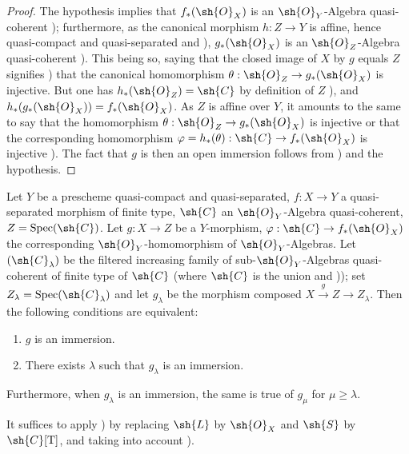 \begin{proof}
The hypothesis implies that $f_*(\sh{O}_X)$ is an $\sh{O}_Y$-Algebra quasi-coherent ); furthermore, as the canonical morphism $h:Z\to Y$ is affine, hence quasi-compact and quasi-separated  and ), $g_*(\sh{O}_X)$ is an $\sh{O}_Z$-Algebra quasi-coherent ).
This being so, saying that the closed image of $X$ by $g$ equals $Z$ signifies ) that the canonical homomorphism $\theta:\sh{O}_Z\to g_*(\sh{O}_X)$ is injective.
But one has $h_*(\sh{O}_Z)=\sh{C}$ by definition of $Z$ ), and $h_*(g_*(\sh{O}_X))=f_*(\sh{O}_X)$.
As $Z$ is affine over $Y$, it amounts to the same to say that the homomorphism $\theta:\sh{O}_Z\to g_*(\sh{O}_X)$ is injective or that the corresponding homomorphism $\varphi=h_*(\theta):\sh{C}\to f_*(\sh{O}_X)$ is injective ).
The fact that $g$ is then an open immersion follows from ) and the hypothesis.
\end{proof}

\begin{lemma}[8.12.2]
\label{IV.8.12.2}
Let $Y$ be a prescheme quasi-compact and quasi-separated, $f:X\to Y$ a quasi-separated morphism of finite type, $\sh{C}$ an $\sh{O}_Y$-Algebra quasi-coherent, $Z=\operatorname{Spec}(\sh{C})$.
Let $g:X\to Z$ be a $Y$-morphism, $\varphi:\sh{C}\to f_*(\sh{O}_X)$ the corresponding $\sh{O}_Y$-homomorphism of $\sh{O}_Y$-Algebras.
Let $(\sh{C}_\lambda)$ be the filtered increasing family of sub-$\sh{O}_Y$-Algebras quasi-coherent of finite type of $\sh{C}$ (where $\sh{C}$ is the union  and )); set $Z_\lambda=\operatorname{Spec}(\sh{C}_\lambda)$ and let $g_\lambda$ be the morphism composed $X\xrightarrow{g}Z\to Z_\lambda$.
Then the following conditions are equivalent:
\begin{enumerate}[label=\emph{\alph*)}]
  \item $g$ is an immersion.
  \item There exists $\lambda$ such that $g_\lambda$ is an immersion.
\end{enumerate}
Furthermore, when $g_\lambda$ is an immersion, the same is true of $g_\mu$ for $\mu\geqslant\lambda$.

It suffices to apply ) by replacing $\sh{L}$ by $\sh{O}_X$ and $\sh{S}$ by $\sh{C}[\mathrm{T}]$, and taking into account ).
\end{lemma}

